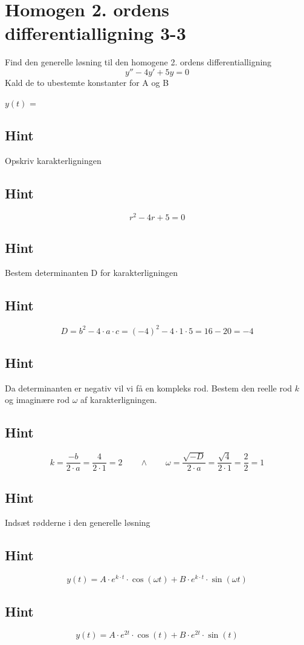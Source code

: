 \documentclass{article}
\newenvironment{exercise}[1]{\newpage\section{#1}}{}
\newcommand{\answerbox}[1]{\fbox{$#1$}}
\newcommand{\hint}{\subsection*{Hint}}
\begin{document}
\begin{exercise}{Homogen 2. ordens differentialligning 3-3}
	
	Find den generelle løsning til den homogene 2. ordens differentialligning
	\[
	y'' - 4y' + 5y = 0
	\]
	Kald de to ubestemte konstanter for A og B
	
	$y(t)$ = \answerbox{A \cdot e^{2 t}  \cdot \cos(t)+ B \cdot e^{2 t}  \cdot \sin(t)}
	
	
	\hint 
	
	Opskriv karakterligningen
	
	\hint
	
	\[
	r^2 - 4r + 5 = 0
	\]
	
	
	\hint
	
	Bestem determinanten D for karakterligningen
	
	
	\hint 
	\[
	D = b^2 - 4 \cdot a \cdot c = (-4)^2 - 4 \cdot 1 \cdot 5 = 16 - 20 = -4
	\]
	
	\hint 
	Da determinanten er negativ vil vi få en kompleks rod. Bestem den reelle rod $k$ og imaginære rod $\omega$ af karakterligningen.
	
	
	\hint
	
	\[
	k = \frac{-b}{2 \cdot a} = \frac{4}{2 \cdot 1} = 2 \qquad \wedge \qquad \omega = \frac{\sqrt{-D}}{2 \cdot a} = \frac{\sqrt{4}}{2 \cdot 1} = \frac{2}{2} = 1
	\]
	
	\hint
	
	Indsæt rødderne i den generelle løsning
	
	\hint
	\[
	y(t) = A \cdot e^{k \cdot t}  \cdot \cos(\omega t)+ B \cdot e^{k \cdot t}  \cdot \sin(\omega t)
	\]
	
	\hint
	
	\[
	y(t) = A \cdot e^{2 t}  \cdot \cos(t)+ B \cdot e^{2 t}  \cdot \sin(t)
	\]
	
\end{exercise}
\end{document}
